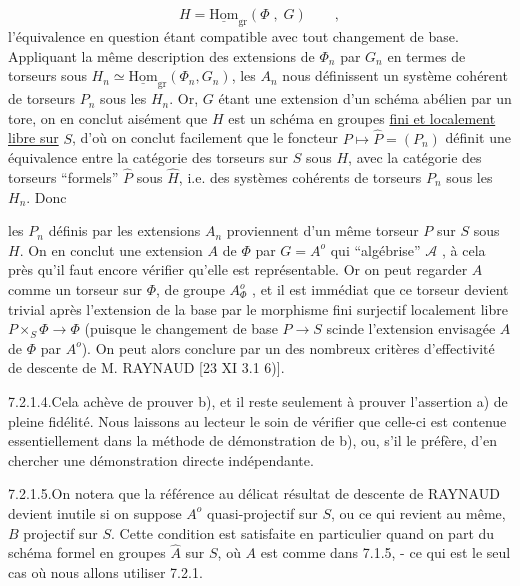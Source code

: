 \begin{equation*}
H = \underline{\mathrm{Hom}}_{\mathrm{gr}}(\Phi \; , \; G) \qquad ,
\end{equation*}
l'équivalence en question étant compatible avec tout changement de base. Appliquant la même description des extensions de $\Phi_{n}$ par $G_{n}$ en termes de torseurs sous $H_{n} \simeq \underline{\mathrm{Hom}}_{\mathrm{gr}}(\Phi_{n},G_{n})$, les $A_{n}$ nous définissent un système cohérent de torseurs $P_{n}$ sous les $H_{n}$. Or, $G$ étant une extension d'un schéma abélien par un tore, on en conclut aisément que $H$ est un schéma en groupes \underline{fini et localement libre sur} $S$, d'où on conclut facilement que le foncteur $P \longmapsto \hat{P} = (P_{n})$ définit une équivalence entre la catégorie des torseurs sur $S$ sous $H$, avec la catégorie des torseurs ``formels'' $\hat{P}$ sous $\hat{H}$, i.e. des systèmes cohérents de torseurs $P_{n}$ sous les $H_{n}$. Donc



les $P_{n}$ définis par les extensions $A_{n}$ proviennent d'un même torseur $P$ sur $S$ sous $H$. On en conclut une extension $A$ de $\Phi$ par $G = A^{o}$ qui ``algébrise'' $\mathcal{A}$ , à cela près qu'il faut encore vérifier qu'elle est représentable. Or on peut regarder $A$ comme un torseur sur $\Phi$, de groupe $A_{\Phi}^{o}$ , et il est immédiat que ce torseur devient trivial après l'extension de la base par le morphisme fini surjectif localement libre $P \times_{S} \Phi \longrightarrow \Phi$ (puisque le changement de base $P \longrightarrow S$ scinde l'extension envisagée $A$ de $\Phi$ par $A^{o}$). On peut alors conclure par \hspace{1.5cm} un des nombreux critères d'effectivité de descente de M. RAYNAUD [23 XI 3.1 6)].

7.2.1.4.\quad Cela achève de prouver b), et il reste seulement à prouver l'assertion a) de pleine fidélité. Nous laissons au lecteur le soin de vérifier que celle-ci est contenue essentiellement dans la méthode de démonstration de b), ou, s'il le préfère, d'en chercher une démonstration directe indépendante.

7.2.1.5.\quad On notera que la référence au délicat résultat de descente de RAYNAUD devient inutile si on suppose $A^{o}$ quasi-projectif sur $S$, ou ce qui revient au même, $B$ projectif sur $S$. Cette condition est satisfaite en particulier quand on part du schéma formel en groupes $\hat{A}$ sur $S$, où $A$ est comme dans 7.1.5, - ce qui est le seul cas où nous allons utiliser 7.2.1.

